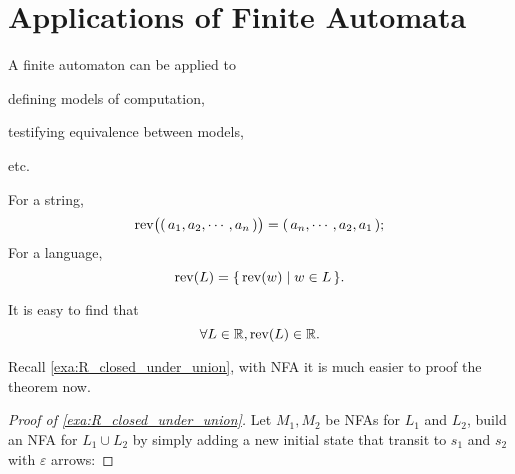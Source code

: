 
\section{Applications of Finite Automata}

A finite automaton can be applied to
\begin{compactitem}
\item defining models of computation,
\item testifying equivalence between models,
\item etc.
\end{compactitem}

\begin{definition}[Reverse]
    For a string,
    \[
        { \mathrm{rev} }\big( { \left(\,a_1,a_2,\cdots, a_n\,\right) } \big) = { \left(\,a_n, \cdots, a_2, a_1\,\right) };
    \]
    For a language,
    \[
        { \mathrm{rev} }(L) = { \left\{\, { \mathrm{rev} }(w) \mid w \in L \,\right\} }.
    \]
\end{definition}

It is easy to find that
\[
    \forall L \in \mathbb R, { \mathrm{rev} } (L) \in \mathbb R.
\]

\begin{example}
    \label{exa:dem_R_closed_under_union}

    Recall \autoref{exa:R_closed_under_union}, with NFA it is much easier to proof the
    theorem now.

    \begin{proof}[Proof of \autoref{exa:R_closed_under_union}]
        Let $M_1, M_2$ be NFAs for $L_1$ and $L_2$,
        build an NFA for $L_1 \cup L_2$
        by simply adding a new initial state that transit to $s_1$ and $s_2$ with
        $\varepsilon$ arrows:
    \end{proof}
\end{example}

